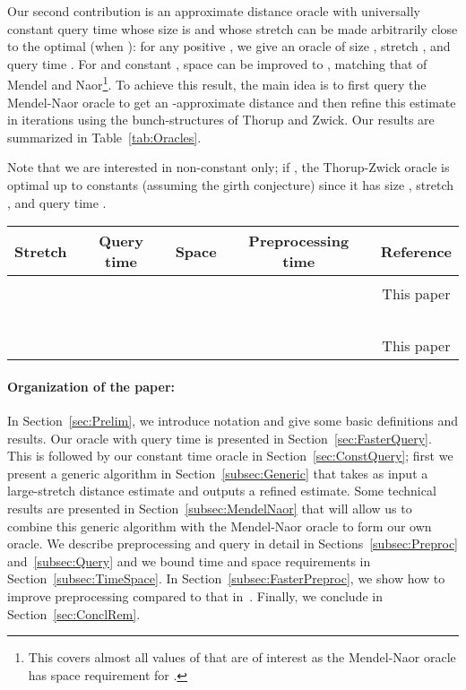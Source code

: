 \documentclass[11pt]{article}
\begin{document}
Our second contribution is an approximate distance oracle with universally constant query time whose size is 
and whose stretch can be made arbitrarily close to the optimal  (when ): for any positive
, we give an oracle of size , stretch ,
and query time . For  and constant , space can be improved to
, matching that of Mendel and Naor\footnote{This covers almost all values of  that are of interest
as the Mendel-Naor oracle has  space requirement for .}.
To achieve this result, the main idea is to first query the Mendel-Naor oracle to get an -approximate distance
and then refine this estimate in  iterations using the
bunch-structures of Thorup and Zwick. Our results are summarized in Table~\ref{tab:Oracles}.

Note that we are interested in non-constant  only; if , the Thorup-Zwick oracle is optimal up to constants
(assuming the girth conjecture) since it has size , stretch , and query time .

\begin{table*}
\begin{center}
\begin{tabular}{|c|c|c|c|c|}
\hline
Stretch        & Query time & Space      & Preprocessing time      & Reference\\
\hline
 &  &  &  & \cite{ThorupZwick, SubquadraticOracleCWN}\\
\hline
 &  &  &  & This paper\\
\hline
 &  &  &  & ~\cite{MendelNaor,CKR}\\
\hline
 &  &  &
 & This paper\\
\hline
\end{tabular}
\end{center}
\caption{Performance of distance oracles in weighted undirected graphs.}\label{tab:Oracles}
\end{table*}

\paragraph{Organization of the paper:}
In Section~\ref{sec:Prelim}, we introduce notation and give some basic definitions and results.
Our oracle with  query time is presented in Section~\ref{sec:FasterQuery}. This is followed by
our constant time oracle in Section~\ref{sec:ConstQuery}; first we present a generic algorithm in
Section~\ref{subsec:Generic} that takes as input a large-stretch distance estimate and outputs a refined
estimate. Some technical results are presented in Section~\ref{subsec:MendelNaor} that will allow us to combine
this generic algorithm with the Mendel-Naor oracle to form our own oracle. We describe preprocessing and query in detail
in Sections~\ref{subsec:Preproc} and~\ref{subsec:Query} and we bound time and space requirements in
Section~\ref{subsec:TimeSpace}. In Section~\ref{subsec:FasterPreproc}, we show how to improve preprocessing compared
to that in~\cite{CKR}.
Finally, we conclude in Section~\ref{sec:ConclRem}.
\end{document}
